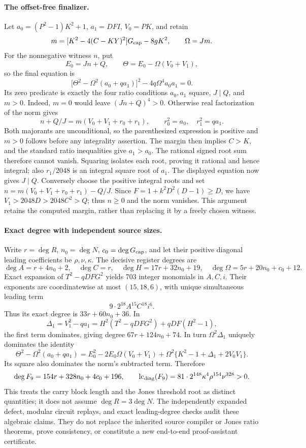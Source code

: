 \paragraph{The offset-free finalizer.}
Let $a_0=(P^2-1)K^2+1$, $a_1=DFI$, $V_0=PK$, and retain
\[
 m=[K^2-4(C-KY)^2]G_{\rm cap}-8gK^2,\qquad \Omega=Jm.
\]
For the nonnegative witness $n$, put
\[
 E_0=Jn+Q,\qquad \Theta=E_0-\Omega(V_0+V_1),
\]
so the final equation is
\begin{equation}\label{eq:quotient-nine-final}
 \boxed{\bigl[\Theta^2-\Omega^2(a_0+qa_1)\bigr]^2
           -4q\Omega^4a_0a_1=0.}
\end{equation}
Its zero predicate is exactly the four ratio conditions
$a_0,a_1$ square, $J\mid Q$, and $m>0$.
Indeed, $m=0$ would leave $(Jn+Q)^4>0$.  Otherwise real factorization
of the norm gives
\[
 n+Q/J=m(V_0+V_1+r_0+r_1),\qquad
 r_0^2=a_0,\quad r_1^2=qa_1.
\]
Both majorants are unconditional, so the parenthesized expression is
positive and $m>0$ follows before any integrality assertion.  The margin
then implies $C>K$, and the standard ratio inequalities give $a_1>a_0$.
The rational signed root sum therefore cannot vanish.  Squaring isolates
each root, proving it rational and hence integral; also
$r_1/2048$ is an integral square root of $a_1$.  The displayed equation
now gives $J\mid Q$.
Conversely choose the positive integral roots and set
$n=m(V_0+V_1+r_0+r_1)-Q/J$.  Since
$F=1+k^2D^2(D-1)\ge D$, we have $V_1>2048D>2048C^2>Q$;
thus $n\ge0$ and the norm vanishes.
This argument retains the computed margin, rather than replacing it
by a freely chosen witness.

\paragraph{Exact degree with independent source sizes.}
Write $r=\deg R$, $n_0=\deg N$, $c_0=\deg G_{\rm cap}$, and let their
positive diagonal leading coefficients be $\rho,\nu,\kappa$.
The decisive register degrees are
\[
 \deg A=r+4n_0+2,\quad \deg C=r,\quad
 \deg H=17r+32n_0+19,\quad
 \deg\Omega=5r+20n_0+c_0+12.
\]
Exact expansion of $T^2-qDFG^2$ yields 703 integer monomials in $A,C,i$.
Their exponents are coordinatewise at most $(15,18,6)$, with unique
simultaneous leading term
\[
 9\cdot2^{18}A^{15}C^{18}i^6.
\]
Thus its exact degree is $33r+60n_0+36$.  In
\[
 \Delta_1=V_1^2-qa_1
 =H^2(T^2-qDFG^2)+qDF(H^2-1),
\]
the first term dominates, giving degree $67r+124n_0+74$.
In turn $\Omega^2\Delta_1$ uniquely dominates the identity
\[
 \Theta^2-\Omega^2(a_0+qa_1)
 =E_0^2-2E_0\Omega(V_0+V_1)
  +\Omega^2\{K^2-1+\Delta_1+2V_0V_1\}.
\]
Its square also dominates the norm's subtracted term.  Therefore
\begin{equation}\label{eq:quotient-nine-degree}
 \deg F_9=154r+328n_0+4c_0+196,
 \qquad
 \operatorname{lc}_{\rm diag}(F_9)
 =81\cdot2^{148}\kappa^4\rho^{154}\nu^{328}>0.
\end{equation}
This treats the carry block length and the Jones threshold root as distinct
quantities; it does not assume $\deg R=3\deg N$.
The independently expanded defect, modular circuit replays, and exact
leading-degree checks audit these algebraic claims.  They do not replace
the inherited source compiler or Jones ratio theorems, prove consistency,
or constitute a new end-to-end proof-assistant certificate.
